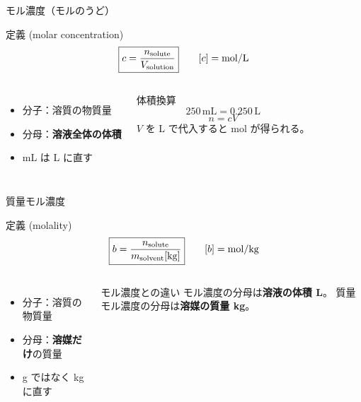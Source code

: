 \documentclass[notheorems,aspectratio=169]{beamer}
\newcommand{\key}[1]{\textbf{\color{ChinaRed}#1}}
\newcommand{\en}[1]{\textcolor{GraphGray}{\scriptsize(#1)}}
\newcommand{\unit}[1]{\,\mathrm{#1}}
\begin{document}
\begin{frame}{モル濃度（モルのうど）}
  \begin{block}{定義 \en{molar concentration}}
    \[
      \boxed{
        c=\frac{n_{\rm solute}}{V_{\rm solution}}
      }
      \qquad
      [c]=\mathrm{mol/L}
    \]
  \end{block}

  \begin{columns}[T,onlytextwidth]
    \begin{itemize}
      \item 分子：溶質の物質量
      \item 分母：\key{溶液全体の体積}
      \item mL は L に直す
    \end{itemize}
    \begin{exampleblock}{体積換算}
      \[
        250\unit{mL}=0.250\unit L
      \]
      \[
        n=cV
      \]
      $V$ を L で代入すると mol が得られる。
    \end{exampleblock}
  \end{columns}
\end{frame}

\begin{frame}{質量モル濃度}
  \begin{block}{定義 \en{molality}}
    \[
      \boxed{
        b=
        \frac{n_{\rm solute}}
             {m_{\rm solvent}[\mathrm{kg}]}
      }
      \qquad
      [b]=\mathrm{mol/kg}
    \]
  \end{block}

  \begin{columns}[T,onlytextwidth]
    \begin{itemize}
      \item 分子：溶質の物質量
      \item 分母：\key{溶媒だけ}の質量
      \item g ではなく kg に直す
    \end{itemize}
    \begin{alertblock}{モル濃度との違い}
      モル濃度の分母は\key{溶液の体積 L}。
      質量モル濃度の分母は\key{溶媒の質量 kg}。
    \end{alertblock}
  \end{columns}
\end{frame}
\end{document}
